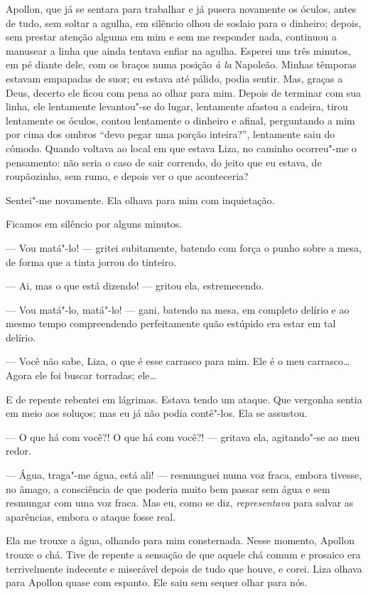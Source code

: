 Apollon, que já se sentara para trabalhar e já pusera novamente os
óculos, antes de tudo, sem soltar a agulha, em silêncio olhou de
soslaio para o dinheiro; depois, sem prestar atenção alguma em mim e
sem me responder nada, continuou a manusear a linha que ainda tentava
enfiar na agulha. Esperei uns três minutos, em pé diante dele, com os
braços numa posição \textit{à la} Napoleão. Minhas
têmporas estavam empapadas de suor; eu estava até pálido, podia sentir.
Mas, graças a Deus, decerto ele ficou com pena ao olhar para mim.
Depois de terminar com sua linha, ele lentamente levantou"-se do lugar,
lentamente afastou a cadeira, tirou lentamente os óculos, contou
lentamente o dinheiro e afinal, perguntando a mim por cima dos
ombros “devo pegar uma porção inteira?”, lentamente saiu do cômodo.
Quando voltava ao local em que estava Liza, no caminho ocorreu"-me o
pensamento: não seria o caso de sair correndo, do jeito que eu estava,
de roupãozinho, sem rumo, e depois ver o que aconteceria?

Sentei"-me novamente. Ela olhava para mim com inquietação.

Ficamos em silêncio por alguns minutos.

--- Vou matá"-lo! --- gritei subitamente, batendo com força o punho sobre a
mesa, de forma que a tinta jorrou do tinteiro.

--- Ai, mas o que está dizendo! --- gritou ela, estremecendo.

--- Vou matá"-lo, matá"-lo! --- gani, batendo na mesa, em completo delírio e
ao mesmo tempo compreendendo perfeitamente quão estúpido era estar em
tal delírio.

--- Você não sabe, Liza, o que é esse carrasco para mim. Ele é o meu
carrasco\ldots{} Agora ele foi buscar torradas; ele\ldots{}

E de repente rebentei em lágrimas. Estava tendo um ataque. Que vergonha
sentia em meio aos soluços; mas eu já não podia contê"-los. Ela se
assustou.

--- O que há com você?! O que há com você?! --- gritava ela, agitando"-se ao
meu redor.

--- Água, traga"-me água, está ali! --- resmunguei numa voz fraca, embora
tivesse, no âmago, a consciência de que poderia muito bem passar sem 
água e sem resmungar com uma voz fraca. Mas eu, como se diz,
\textit{representava} para salvar as aparências, embora o ataque fosse
real.

Ela me trouxe a água, olhando para mim consternada. Nesse momento,
Apollon trouxe o chá. Tive de repente a sensação de que aquele chá
comum e prosaico era terrivelmente indecente e miserável depois de tudo
que houve, e corei. Liza olhava para Apollon quase com espanto. Ele
saiu sem sequer olhar para nós.

